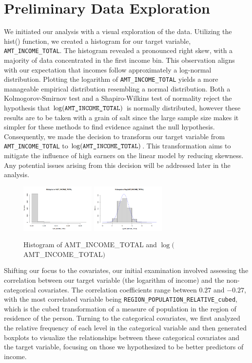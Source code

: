 \documentclass[hidelinks,12pt]{article}
\begin{document}
\section{Preliminary Data Exploration}
We initiated our analysis with a visual exploration of the data. Utilizing the hist() function, we created a histogram for our target variable, \verb|AMT_INCOME_TOTAL|. The histogram revealed a pronounced right skew, with a majority of data concentrated in the first income bin. This observation aligns with our expectation that incomes follow approximately a log-normal distribution. Plotting the logarithm of \verb|AMT_INCOME_TOTAL| yields a more manageable empirical distribution resembling a normal distribution. Both a Kolmogorov-Smirnov test and a Shapiro-Wilkins test of normality reject the hypothesis that $\log(\verb|AMT_INCOME_TOTAL|)$ is normally distributed, however these results are to be taken with a grain of salt since the large sample size makes it simpler for these methods to find evidence against the null hypothesis. Consequently, we made the decision to transform our target variable from \verb|AMT_INCOME_TOTAL| to $\log(\verb|AMT_INCOME_TOTAL|)$\cite{West2022-zj}. This transformation aims to mitigate the influence of high earners on the linear model by reducing skewness. Any potential issues arising from this decision will be addressed later in the analysis.
\begin{figure}[h]
  \begin{center}
  \includegraphics[width=0.33\textwidth]{img/83b37f62-d6f5-4e84-a7da-80b36e664b55.png}
  \includegraphics[width=0.33\textwidth]{img/c3b5fc12-a0e0-45e1-808b-eaa610e5e5ec.png}
\end{center}
\caption{Histogram of AMT\_INCOME\_TOTAL and $\log($AMT\_INCOME\_TOTAL$)$}
\end{figure}
Shifting our focus to the covariates, our initial examination involved assessing the correlation between our target variable (the logarithm of income) and the non-categorical covariates. The correlation coefficients range between $0.27$ and $-0.27$, with the most correlated variable being \verb|REGION_POPULATION_RELATIVE_cubed|, which is the cubed transformation of a measure of population in the region of residence of the person. Turning to the categorical covariates, we first analyzed the relative frequency of each level in the categorical variable and then generated boxplots to visualize the relationships between these categorical covariates and the target variable, focusing on those we hypothesized to be better predictors of income.
\end{document}
